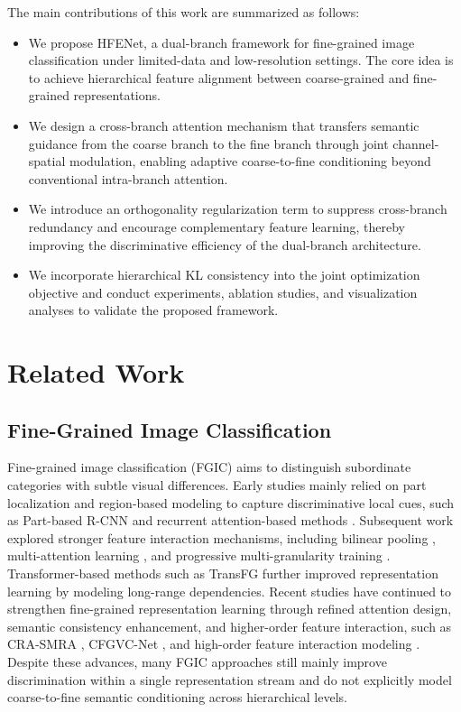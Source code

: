 \documentclass[pdflatex,iicol,sn-mathphys-num]{sn-jnl}
\theoremstyle{thmstyleone}%
\theoremstyle{thmstyletwo}%
\theoremstyle{thmstylethree}%
\begin{document}
The main contributions of this work are summarized as follows:
\begin{itemize}
    \item We propose HFENet, a dual-branch framework for fine-grained image classification under limited-data and low-resolution settings. The core idea is to achieve hierarchical feature alignment between coarse-grained and fine-grained representations.
    \item We design a cross-branch attention mechanism that transfers semantic guidance from the coarse branch to the fine branch through joint channel-spatial modulation, enabling adaptive coarse-to-fine conditioning beyond conventional intra-branch attention.
    \item We introduce an orthogonality regularization term to suppress cross-branch redundancy and encourage complementary feature learning, thereby improving the discriminative efficiency of the dual-branch architecture.
    \item We incorporate hierarchical KL consistency into the joint optimization objective and conduct experiments, ablation studies, and visualization analyses to validate the proposed framework.
\end{itemize}

\section{Related Work}
\label{sec:related_work}

\subsection{Fine-Grained Image Classification}
Fine-grained image classification (FGIC) aims to distinguish subordinate categories with subtle visual differences. 
Early studies mainly relied on part localization and region-based modeling to capture discriminative local cues, such as Part-based R-CNN \cite{part_rcnn} and recurrent attention-based methods \cite{fu2017look}. 
Subsequent work explored stronger feature interaction mechanisms, including bilinear pooling \cite{bilinear_cnn}, multi-attention learning \cite{zheng2017learning}, and progressive multi-granularity training \cite{du2020fine}. 
Transformer-based methods such as TransFG \cite{he2021transfg} further improved representation learning by modeling long-range dependencies. 
Recent studies have continued to strengthen fine-grained representation learning through refined attention design, semantic consistency enhancement, and higher-order feature interaction, such as CRA-SMRA \cite{wang2025crasmra}, CFGVC-Net \cite{wang2025cfgvc}, and high-order feature interaction modeling \cite{sikdar2025interweaving}. 
Despite these advances, many FGIC approaches still mainly improve discrimination within a single representation stream and do not explicitly model coarse-to-fine semantic conditioning across hierarchical levels.
\end{document}
